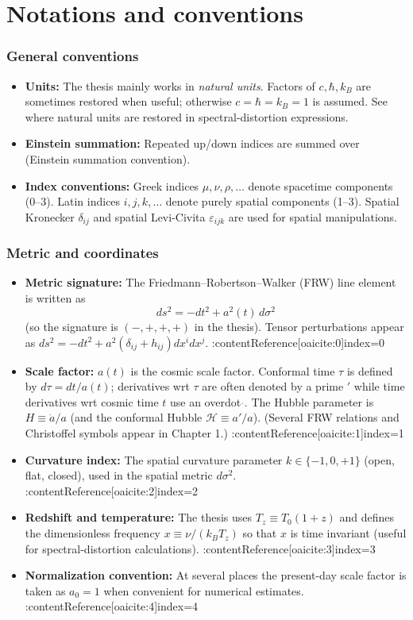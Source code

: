 \section*{Notations and conventions}
\vspace*{\fill}
\subsubsection{General conventions}
\begin{itemize}
  \item \textbf{Units:} The thesis mainly works in \emph{natural units}. Factors of $c,\hbar,k_B$ are sometimes restored when useful; otherwise $c=\hbar=k_B=1$ is assumed. See where natural units are restored in spectral-distortion expressions. 
  \item \textbf{Einstein summation:} Repeated up/down indices are summed over (Einstein summation convention).
  \item \textbf{Index conventions:} Greek indices $\mu,\nu,\rho,\dots$ denote spacetime components (0--3). Latin indices $i,j,k,\dots$ denote purely spatial components (1--3). Spatial Kronecker $\delta_{ij}$ and spatial Levi-Civita $\varepsilon_{ijk}$ are used for spatial manipulations.
\end{itemize}

\subsubsection{Metric and coordinates}
\begin{itemize}
  \item \textbf{Metric signature:} The Friedmann--Robertson--Walker (FRW) line element is written as
  \[ ds^2 = -dt^2 + a^2(t)\,d\sigma^2 \]
  (so the signature is $(-,+,+,+)$ in the thesis). Tensor perturbations appear as $ds^2 = -dt^2 + a^2(\delta_{ij}+h_{ij})dx^idx^j$. :contentReference[oaicite:0]{index=0}
  \item \textbf{Scale factor:} $a(t)$ is the cosmic scale factor. Conformal time $\tau$ is defined by $d\tau = dt/a(t)$; derivatives wrt $\tau$ are often denoted by a prime $'$ while time derivatives wrt cosmic time $t$ use an overdot $\dot{}$. The Hubble parameter is $H\equiv \dot a/a$ (and the conformal Hubble $\mathcal{H}\equiv a'/a$). (Several FRW relations and Christoffel symbols appear in Chapter 1.) :contentReference[oaicite:1]{index=1}
  \item \textbf{Curvature index:} The spatial curvature parameter $k\in\{-1,0,+1\}$ (open, flat, closed), used in the spatial metric $d\sigma^2$. :contentReference[oaicite:2]{index=2}
  \item \textbf{Redshift and temperature:} The thesis uses $T_z\equiv T_0(1+z)$ and defines the dimensionless frequency $x\equiv \nu/(k_B T_z)$ so that $x$ is time invariant (useful for spectral-distortion calculations). :contentReference[oaicite:3]{index=3}
  \item \textbf{Normalization convention:} At several places the present-day scale factor is taken as $a_0=1$ when convenient for numerical estimates. :contentReference[oaicite:4]{index=4}
\end{itemize}

